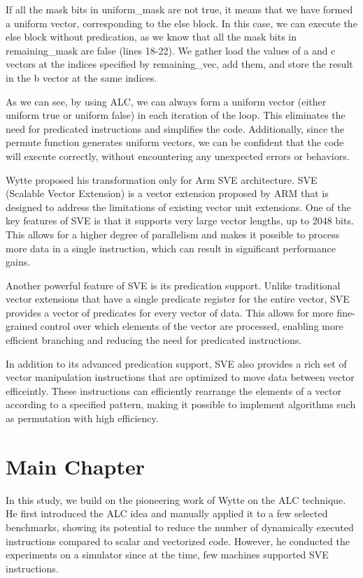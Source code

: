 \documentclass[\main/thesis.tex]{subfiles}
\begin{document}
If all the mask bits in uniform\_mask are not true, it means that we have formed a uniform vector, corresponding to the else block. In this case, we can execute the else block without predication, as we know that all the mask bits in remaining\_mask are false (lines 18-22). We gather load the values of a and c vectors at the indices specified by remaining\_vec, add them, and store the result in the b vector at the same indices.

As we can see, by using ALC, we can always form a uniform vector (either uniform true or uniform false) in each iteration of the loop. This eliminates the need for predicated instructions and simplifies the code. Additionally, since the permute function generates uniform vectors, we can be confident that the code will execute correctly, without encountering any unexpected errors or behaviors.


Wytte proposed his transformation only for Arm SVE architecture. SVE (Scalable Vector Extension) is a vector extension proposed by ARM that is designed to address the limitations of existing vector unit extensions. One of the key features of SVE is that it supports very large vector lengths, up to 2048 bits. This allows for a higher degree of parallelism and makes it possible to process more data in a single instruction, which can result in significant performance gains.

Another powerful feature of SVE is its predication support. Unlike traditional vector extensions that have a single predicate register for the entire vector, SVE provides a vector of predicates for every vector of data. This allows for more fine-grained control over which elements of the vector are processed, enabling more efficient branching and reducing the need for predicated instructions.

In addition to its advanced predication support, SVE also provides a rich set of vector manipulation instructions that are optimized to move data between vector efficeintly. These instructions can efficiently rearrange the elements of a vector according to a specified pattern, making it possible to implement algorithms such as permutation with high efficiency.


\chapter{Main Chapter}


In this study, we build on the pioneering work of Wytte on the ALC technique. He first introduced the ALC idea and manually applied it to a few selected benchmarks, showing its potential to reduce the number of dynamically executed instructions compared to scalar and vectorized code. However, he conducted the experiments on a simulator since at the time, few machines supported SVE instructions.
\end{document}
